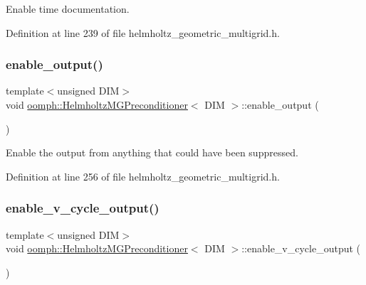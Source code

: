 Enable time documentation. 



Definition at line 239 of file helmholtz\+\_\+geometric\+\_\+multigrid.\+h.

\mbox{\label{classoomph_1_1HelmholtzMGPreconditioner_a91ba5204f62cf8df208d51025cb56fba}} 
\subsubsection{\texorpdfstring{enable\+\_\+output()}{enable\_output()}}
{\footnotesize\ttfamily template$<$unsigned D\+IM$>$ \\
void \hyperlink{classoomph_1_1HelmholtzMGPreconditioner}{oomph\+::\+Helmholtz\+M\+G\+Preconditioner}$<$ D\+IM $>$\+::enable\+\_\+output (\begin{DoxyParamCaption}{ }\end{DoxyParamCaption})\hspace{0.3cm}{\ttfamily [inline]}}



Enable the output from anything that could have been suppressed. 



Definition at line 256 of file helmholtz\+\_\+geometric\+\_\+multigrid.\+h.

\mbox{\label{classoomph_1_1HelmholtzMGPreconditioner_a0978e7e6cfa01eb58c10b88ba4c9f2e5}} 
\subsubsection{\texorpdfstring{enable\+\_\+v\+\_\+cycle\+\_\+output()}{enable\_v\_cycle\_output()}}
{\footnotesize\ttfamily template$<$unsigned D\+IM$>$ \\
void \hyperlink{classoomph_1_1HelmholtzMGPreconditioner}{oomph\+::\+Helmholtz\+M\+G\+Preconditioner}$<$ D\+IM $>$\+::enable\+\_\+v\+\_\+cycle\+\_\+output (\begin{DoxyParamCaption}{ }\end{DoxyParamCaption})\hspace{0.3cm}{\ttfamily [inline]}}




